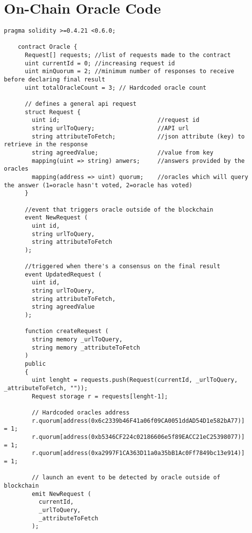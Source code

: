 \chapter{On-Chain Oracle Code} \label{ap2:on-chain-oracle-code}

\begin{lstlisting}[language=Solidity]
    pragma solidity >=0.4.21 <0.6.0;

    contract Oracle {
      Request[] requests; //list of requests made to the contract
      uint currentId = 0; //increasing request id
      uint minQuorum = 2; //minimum number of responses to receive before declaring final result
      uint totalOracleCount = 3; // Hardcoded oracle count

      // defines a general api request
      struct Request {
        uint id;                            //request id
        string urlToQuery;                  //API url
        string attributeToFetch;            //json attribute (key) to retrieve in the response
        string agreedValue;                 //value from key
        mapping(uint => string) anwers;     //answers provided by the oracles
        mapping(address => uint) quorum;    //oracles which will query the answer (1=oracle hasn't voted, 2=oracle has voted)
      }

      //event that triggers oracle outside of the blockchain
      event NewRequest (
        uint id,
        string urlToQuery,
        string attributeToFetch
      );

      //triggered when there's a consensus on the final result
      event UpdatedRequest (
        uint id,
        string urlToQuery,
        string attributeToFetch,
        string agreedValue
      );

      function createRequest (
        string memory _urlToQuery,
        string memory _attributeToFetch
      )
      public
      {
        uint lenght = requests.push(Request(currentId, _urlToQuery, _attributeToFetch, ""));
        Request storage r = requests[lenght-1];

        // Hardcoded oracles address
        r.quorum[address(0x6c2339b46F41a06f09CA0051ddAD54D1e582bA77)] = 1;
        r.quorum[address(0xb5346CF224c02186606e5f89EACC21eC25398077)] = 1;
        r.quorum[address(0xa2997F1CA363D11a0a35bB1Ac0Ff7849bc13e914)] = 1;

        // launch an event to be detected by oracle outside of blockchain
        emit NewRequest (
          currentId,
          _urlToQuery,
          _attributeToFetch
        );


\end{lstlisting}
